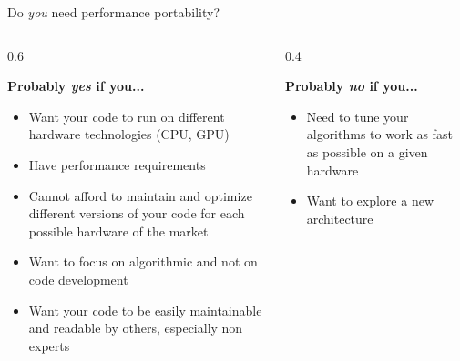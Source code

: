 
\begin{frame}{Do \emph{you} need performance portability?}
    \begin{columns}[T]
        \begin{column}{0.6\linewidth}
            \begin{center}
                \textbf{Probably \emph{yes} if you...}
            \end{center}
            \begin{itemize}
                \item Want your code to run on different hardware technologies (CPU, GPU)
                \item Have performance requirements
                \item Cannot afford to maintain and optimize different versions of your code for each possible hardware of the market
                \item Want to focus on algorithmic and not on code development
                \item Want your code to be easily maintainable and readable by others, especially non experts
            \end{itemize}
        \end{column}
        \pause
        \begin{column}{0.4\linewidth}
            \begin{center}
                \textbf{Probably \emph{no} if you...}
            \end{center}
            \begin{itemize}
                \item Need to tune your algorithms to work as fast as possible on a given hardware
                \item Want to explore a new architecture
            \end{itemize}
        \end{column}
    \end{columns}
\end{frame}


